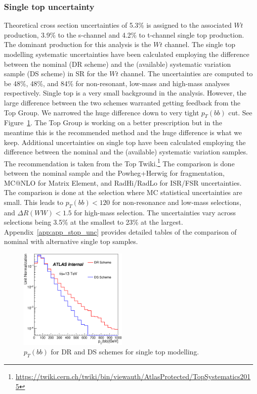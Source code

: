 \subsubsection{Single top uncertainty}
Theoretical cross section uncertainties of 5.3\% is assigned to the associated $Wt$ production,  3.9\% to the s-channel and 4.2\% to t-channel single top production.  The dominant production for this analysis is the $Wt$ channel.  The single top modelling systematic uncertainties have been calculated employing the difference between the nominal (DR scheme) and the (available) systematic variation sample (DS scheme) in SR for the $Wt$ channel. The uncertainties are computed to be 48\%, 48\%, and 84\% for non-resonant, low-mass and high-mass analyses respectively.  Single top is a very small background in the analysis. However, the large difference between the two schemes warranted getting feedback from the Top Group. We narrowed the huge difference down to very tight $p_{T} (bb)$ cut. See Figure~\ref{fig:stop_bbpt}. The Top Group is working on a better prescription but in the meantime this is the recommended method and the huge difference is what we keep. 
Additional uncertainties on single top have been calculated employing the difference between the nominal and the (available) systematic variation samples. The recommendation is taken from the Top Twiki.{\footnote {\url{https://twiki.cern.ch/twiki/bin/viewauth/AtlasProtected/TopSystematics2015}}} 
The comparison is done between the nominal sample and the Powheg+Herwig for fragmentation, MC@NLO for Matrix Element, and RadHi/RadLo for ISR/FSR uncertainties. The comparison is done at the selection where MC statistical uncertainties are small. This leads to $p_{T}(bb) < 120$ for non-resonance and low-mass selections, and $\Delta R(WW) < 1.5$ for high-mass selection. 
The uncertainties vary across selections being 3.5\% at the smallest to 23\% at the largest. Appendix~\ref{app:app_stop_unc} provides detailed tables of the comparison of nominal with alternative single top samples. 

\begin{figure}[!h]
\begin{center}
\includegraphics*[width=0.47\textwidth] {figures/DR_DS_bbpt.eps}
\caption[$p_{T}(bb)$  for DR and DS schemes for single top modelling.]{$p_{T}(bb)$  for DR and DS schemes for single top modelling.}
\label{fig:stop_bbpt}
\end{center}
\end{figure}

